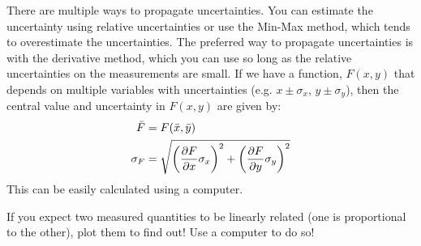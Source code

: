 \begin{chapterSummary}
There are multiple ways to propagate uncertainties. You can estimate the uncertainty using relative uncertainties or use the Min-Max method, which tends to overestimate the uncertainties. The preferred way to propagate uncertainties is with the derivative method, which you can use so long as the relative uncertainties on the measurements are small. If we have a function, $F(x,y)$ that depends on multiple variables with uncertainties (e.g. $x\pm\sigma_x$, $y\pm\sigma_y$), then the central value and uncertainty in $F(x,y)$ are given by:
\begin{align*}
\bar F &= F(\bar x, \bar y) \nonumber \\
\sigma_F &= \sqrt{\left(\frac{\partial F}{\partial x}\sigma_x \right)^2 + \left(\frac{\partial F}{\partial y}\sigma_y \right)^2 }
\end{align*}
This can be easily calculated using a computer. 

If you expect two measured quantities to be linearly related (one is proportional to the other), plot them to find out! Use a computer to do so!

\end{chapterSummary}

